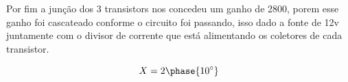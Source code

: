 \documentclass[a4paper, 12pt]{article}
\begin{document}
Por fim a junção dos 3 transistors nos concedeu um ganho de 2800, porem esse ganho foi cascateado conforme o circuito foi passando, isso dado a fonte de 12v juntamente com o divisor de corrente que está alimentando os coletores de cada transistor.










\begin{equation*}
    X = 2\phase{10^ {\circ}}
\end{equation*}









\newpage



\end{document}
